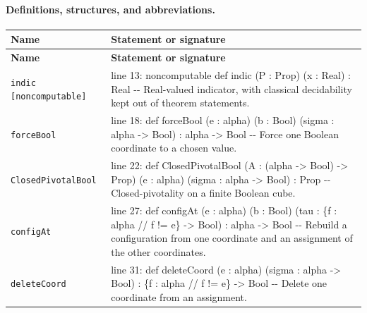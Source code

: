 \documentclass[10pt]{article}
\begin{document}
\paragraph{Definitions, structures, and abbreviations.}
\begin{longtable}{>{\raggedright\arraybackslash}p{} >{\raggedright\arraybackslash}p{}}
\textbf{Name} & \textbf{Statement or signature} \\
\hline
\endfirsthead
\textbf{Name} & \textbf{Statement or signature} \\
\hline
\endhead
\texttt{indic [noncomputable]} & {\ttfamily\scriptsize line 13:\allowbreak{} noncomputable def indic (\allowbreak{}P :\allowbreak{} Prop)\allowbreak{} (\allowbreak{}x :\allowbreak{} Real)\allowbreak{} :\allowbreak{} Real -\allowbreak{}-\allowbreak{} Real-\allowbreak{}valued indicator,\allowbreak{} with classical decidability kept out of theorem statements.\allowbreak{}} \\[0.45em]
\texttt{forceBool} & {\ttfamily\scriptsize line 18:\allowbreak{} def forceBool (\allowbreak{}e :\allowbreak{} alpha)\allowbreak{} (\allowbreak{}b :\allowbreak{} Bool)\allowbreak{} (\allowbreak{}sigma :\allowbreak{} alpha -\allowbreak{}> Bool)\allowbreak{} :\allowbreak{} alpha -\allowbreak{}> Bool -\allowbreak{}-\allowbreak{} Force one Boolean coordinate to a chosen value.\allowbreak{}} \\[0.45em]
\texttt{ClosedPivotalBool} & {\ttfamily\scriptsize line 22:\allowbreak{} def ClosedPivotalBool (\allowbreak{}A :\allowbreak{} (\allowbreak{}alpha -\allowbreak{}> Bool)\allowbreak{} -\allowbreak{}> Prop)\allowbreak{} (\allowbreak{}e :\allowbreak{} alpha)\allowbreak{} (\allowbreak{}sigma :\allowbreak{} alpha -\allowbreak{}> Bool)\allowbreak{} :\allowbreak{} Prop -\allowbreak{}-\allowbreak{} Closed-\allowbreak{}pivotality on a finite Boolean cube.\allowbreak{}} \\[0.45em]
\texttt{configAt} & {\ttfamily\scriptsize line 27:\allowbreak{} def configAt (\allowbreak{}e :\allowbreak{} alpha)\allowbreak{} (\allowbreak{}b :\allowbreak{} Bool)\allowbreak{} (\allowbreak{}tau :\allowbreak{} \{f :\allowbreak{} alpha /\allowbreak{}/\allowbreak{} f !=\allowbreak{} e\} -\allowbreak{}> Bool)\allowbreak{} :\allowbreak{} alpha -\allowbreak{}> Bool -\allowbreak{}-\allowbreak{} Rebuild a configuration from one coordinate and an assignment of the other coordinates.\allowbreak{}} \\[0.45em]
\texttt{deleteCoord} & {\ttfamily\scriptsize line 31:\allowbreak{} def deleteCoord (\allowbreak{}e :\allowbreak{} alpha)\allowbreak{} (\allowbreak{}sigma :\allowbreak{} alpha -\allowbreak{}> Bool)\allowbreak{} :\allowbreak{} \{f :\allowbreak{} alpha /\allowbreak{}/\allowbreak{} f !=\allowbreak{} e\} -\allowbreak{}> Bool -\allowbreak{}-\allowbreak{} Delete one coordinate from an assignment.\allowbreak{}} \\[0.45em]

\end{longtable}
\end{document}
